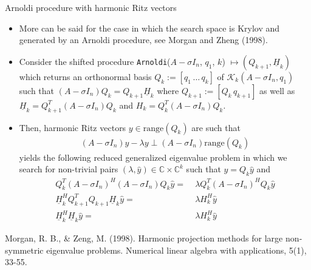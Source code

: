 \documentclass[t,usepdftitle=false]{beamer}
\begin{document}
\begin{frame}{Arnoldi procedure with harmonic Ritz vectors}
\begin{itemize}
\item More can be said for the case in which the search space is Krylov and generated by an Arnoldi procedure, see Morgan and Zheng (1998).
\item Consider the shifted procedure \texttt{Arnoldi}($A-\sigma I_n$, $q_1$, $k$) $\mapsto(Q_{k+1},\underline{H}_k)$ which returns an orthonormal basis $Q_{k}:=[q_1\,\dots\,q_k]$ of $\mathcal{K}_{k}(A-\sigma I_n,q_1)$ such that $\!(A-\sigma I_n)Q_k=Q_{k+1}\underline{H}_k$ where $Q_{k+1}:=[Q_k\,q_{k+1}]$ as well as $\underline{H}_k=Q_{k+1}^T(A-\sigma I_n)Q_k$ and $H_k=Q_k^T(A-\sigma I_n)Q_k$.
\item Then, harmonic Ritz vectors $y\in\text{range}(Q_k)$ are such that 
\begin{align*}
(A-\sigma I_n)y-\lambda y\perp (A-\sigma I_n)\text{range}(Q_k)
\end{align*}
yields the following reduced generalized eigenvalue problem in which we search for non-trivial pairs $(\lambda,\hat{y})\in\mathbb{C}\times\mathbb{C}^{k}$ such that $y=Q_k\hat{y}$ and
\begin{align*}
Q_k^T(A-\sigma I_n)^H(A-\sigma I_n)Q_k\hat{y}=&\;\lambda Q_k^T(A-\sigma I_n)^HQ_k\hat{y}\\
\underline{H}^H_kQ_{k+1}^TQ_{k+1}\underline{H}_k\hat{y}=&\;\lambda H_k^H\hat{y}\\
\underline{H}^H_k\underline{H}_k\hat{y}=&\;\lambda H_k^H\hat{y}
\end{align*}
\end{itemize}
\medskip
\tiny{Morgan, R. B., \& Zeng, M. (1998). Harmonic projection methods for large non‐symmetric eigenvalue problems. Numerical linear algebra with applications, 5(1), 33-55.}
\end{frame}
\end{document}
